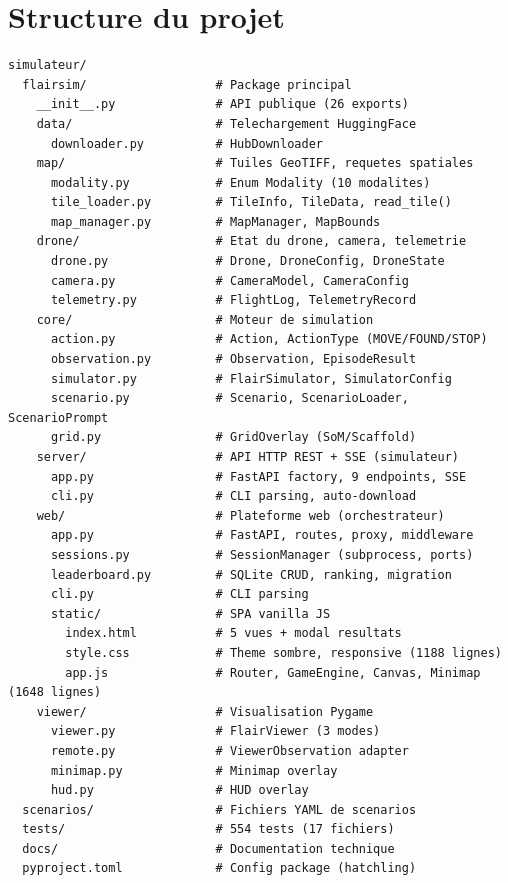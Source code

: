 \documentclass[a4paper, 11pt, french]{article}
\begin{document}
\section{Structure du projet}
\label{sec:structure}

\begin{lstlisting}[language={}, basicstyle=\ttfamily\scriptsize]
simulateur/
  flairsim/                  # Package principal
    __init__.py              # API publique (26 exports)
    data/                    # Telechargement HuggingFace
      downloader.py          # HubDownloader
    map/                     # Tuiles GeoTIFF, requetes spatiales
      modality.py            # Enum Modality (10 modalites)
      tile_loader.py         # TileInfo, TileData, read_tile()
      map_manager.py         # MapManager, MapBounds
    drone/                   # Etat du drone, camera, telemetrie
      drone.py               # Drone, DroneConfig, DroneState
      camera.py              # CameraModel, CameraConfig
      telemetry.py           # FlightLog, TelemetryRecord
    core/                    # Moteur de simulation
      action.py              # Action, ActionType (MOVE/FOUND/STOP)
      observation.py         # Observation, EpisodeResult
      simulator.py           # FlairSimulator, SimulatorConfig
      scenario.py            # Scenario, ScenarioLoader, ScenarioPrompt
      grid.py                # GridOverlay (SoM/Scaffold)
    server/                  # API HTTP REST + SSE (simulateur)
      app.py                 # FastAPI factory, 9 endpoints, SSE
      cli.py                 # CLI parsing, auto-download
    web/                     # Plateforme web (orchestrateur)
      app.py                 # FastAPI, routes, proxy, middleware
      sessions.py            # SessionManager (subprocess, ports)
      leaderboard.py         # SQLite CRUD, ranking, migration
      cli.py                 # CLI parsing
      static/                # SPA vanilla JS
        index.html           # 5 vues + modal resultats
        style.css            # Theme sombre, responsive (1188 lignes)
        app.js               # Router, GameEngine, Canvas, Minimap (1648 lignes)
    viewer/                  # Visualisation Pygame
      viewer.py              # FlairViewer (3 modes)
      remote.py              # ViewerObservation adapter
      minimap.py             # Minimap overlay
      hud.py                 # HUD overlay
  scenarios/                 # Fichiers YAML de scenarios
  tests/                     # 554 tests (17 fichiers)
  docs/                      # Documentation technique
  pyproject.toml             # Config package (hatchling)
\end{lstlisting}
\end{document}
